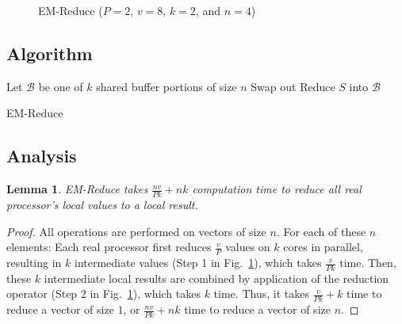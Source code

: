 \documentclass[12pt]{carletoncsthesis}
\newtheorem{lemma}[thm]{Lemma}
\begin{document}
\begin{figure}[h]
\begin{center}
\caption{{\sc EM-Reduce} ($P=2$, $v=8$, $k=2$, and $n=4$)}
\label{em-reduce-diag}
\end{center}
\end{figure}


\clearpage
\subsection{Algorithm}


\begin{algorithm}[h]
\BlankLine
Let $\mathcal{B}$ be one of $k$ shared buffer portions of size $n$\;
\BlankLine
{}
	Swap out\;
	Reduce $S$ into $\mathcal{B}$\;
\BlankLine{}
\BlankLine
{}
\BlankLine{}\BlankLine
\caption{{\sc EM-Reduce}}
\label{em-reduce}
\end{algorithm}


\subsection{Analysis}


\begin{lemma}
\label{em-reduce-cpu}
{\sc EM-Reduce} takes $\frac{nv}{Pk} + nk$ computation time to
reduce all real processor's local values to a local result.
\end{lemma}
\begin{proof}
All operations are performed on vectors of size $n$.  For each of these
$n$ elements: Each real processor first reduces $\frac{v}{P}$ values on
$k$ cores in parallel, resulting in $k$ intermediate values (Step 1 in
Fig.~\ref{em-reduce-diag}), which takes $\frac{v}{Pk}$ time.  Then, these
$k$ intermediate local results are combined by application of the reduction
operator (Step 2 in Fig.~\ref{em-reduce-diag}), which takes $k$ time.
Thus, it takes $\frac{v}{Pk} + k$ time to reduce a vector of size $1$,
or $\frac{nv}{Pk} + nk$ time to reduce a vector of size $n$.
\end{proof}
\end{document}
